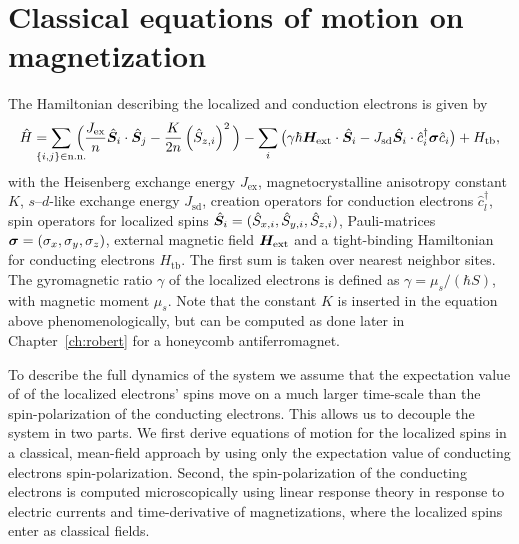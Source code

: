 \section{Classical equations of motion on magnetization}\label{cd:sd:motion}
The Hamiltonian describing the localized and conduction electrons is given by
\begin{multline}
    \hat{H}
        = \sum_{\mathclap{\{i,j\}\in\text{n.n.}}}\,\Big(\frac{J_{\text{ex}}}{n}\hat{\bb{S}}_i\cdot\hat{\bb{S}}_j - \frac{K}{2n}\left(\hat{{S}}_{z,i}\right)^2%
        \Big)-\sum_i \big(\gamma\hbar\bb{H}_\text{ext}\cdot\hat{\bb{S}}_i-J_\text{sd}\hat{\bb{S}}_i\cdot\hat{c}_i^\dagger\bb{\sigma}\hat{c}_i\big)+H_\text{tb},
    \label{intro:eq:Hm}%
\end{multline}
with the Heisenberg exchange energy $J_{\text{ex}}$, magnetocrystalline anisotropy constant $K$, $s$--$d$-like exchange energy $J_{\text{sd}}$, creation operators for conduction electrons $\hat{c}^\dagger_l$, spin operators for localized spins $\hat{\boldsymbol{S}}_i = (\hat{{S}}_{x,i}, \hat{{S}}_{y,i}, \hat{{S}}_{z,i})$, Pauli-matrices $\boldsymbol{\sigma}=(\sigma_x,\sigma_y,\sigma_z)$, external magnetic field $\boldsymbol{H}_\text{ext}$ and a tight-binding Hamiltonian for conducting electrons $H_\text{tb}$. The first sum is taken over nearest neighbor sites. The gyromagnetic ratio $\gamma$ of the localized electrons is defined as $\gamma=\mu_s/(\hbar S)$, with magnetic moment $\mu_s$. Note that the constant $K$ is inserted in the equation above phenomenologically, but can be computed as done later in Chapter~\ref{ch:robert} for a honeycomb antiferromagnet.

To describe the full dynamics of the system we assume that the expectation value of of the localized electrons' spins move on a much larger time-scale than the spin-polarization of the conducting electrons. This allows us to decouple the system in two parts. We first derive equations of motion for the localized spins in a classical, mean-field approach by using only the expectation value of conducting electrons spin-polarization. Second, the spin-polarization of the conducting electrons is computed microscopically using linear response theory in response to electric currents and time-derivative of magnetizations, where the localized spins enter as classical fields. 

